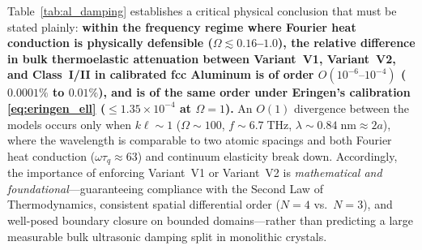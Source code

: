 Table~\ref{tab:al_damping} establishes a critical physical conclusion that must be stated plainly: \textbf{within the frequency regime where Fourier heat conduction is physically defensible ($\Omega \lesssim 0.16$--$1.0$), the relative difference in bulk thermoelastic attenuation between Variant~V1, Variant~V2, and Class~I/II in calibrated fcc Aluminum is of order $O(10^{-6}\text{--}10^{-4})$ ($0.0001\%$ to $0.01\%$), and is of the same order under Eringen's calibration \eqref{eq:eringen_ell} ($\le 1.35 \times 10^{-4}$ at $\Omega = 1$).} An $O(1)$ divergence between the models occurs only when $k\ell \sim 1$ ($\Omega \sim 100$, $f \sim 6.7\;\mathrm{THz}$, $\lambda \sim 0.84\;\mathrm{nm} \approx 2a$), where the wavelength is comparable to two atomic spacings and both Fourier heat conduction ($\omega\tau_q \approx 63$) and continuum elasticity break down. Accordingly, the importance of enforcing Variant~V1 or Variant~V2 is \emph{mathematical and foundational}---guaranteeing compliance with the Second Law of Thermodynamics, consistent spatial differential order ($N=4$ vs.\ $N=3$), and well-posed boundary closure on bounded domains---rather than predicting a large measurable bulk ultrasonic damping split in monolithic crystals.
